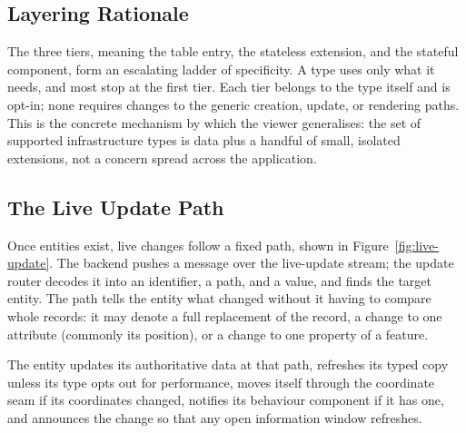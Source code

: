 \subsection{Layering Rationale}

The three tiers, meaning the table entry, the stateless extension, and the stateful component, form an escalating ladder of specificity. A type uses only what it needs, and most stop at the first tier. Each tier belongs to the type itself and is opt-in; none requires changes to the generic creation, update, or rendering paths. This is the concrete mechanism by which the viewer generalises: the set of supported infrastructure types is data plus a handful of small, isolated extensions, not a concern spread across the application.

\subsection{The Live Update Path}
\label{sec:live-update-path}

Once entities exist, live changes follow a fixed path, shown in Figure~\ref{fig:live-update}. The backend pushes a message over the live-update stream; the update router decodes it into an identifier, a path, and a value, and finds the target entity. The path tells the entity what changed without it having to compare whole records: it may denote a full replacement of the record, a change to one attribute (commonly its position), or a change to one property of a feature.

The entity updates its authoritative data at that path, refreshes its typed copy unless its type opts out for performance, moves itself through the coordinate seam if its coordinates changed, notifies its behaviour component if it has one, and announces the change so that any open information window refreshes.

